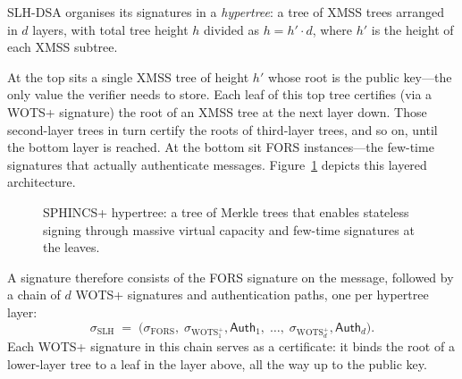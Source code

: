 SLH-DSA organises its signatures in a \emph{hypertree}: a tree of XMSS trees arranged in $d$ layers, with total tree height $h$ divided as $h = h' \cdot d$, where $h'$ is the height of each XMSS subtree.

At the top sits a single XMSS tree of height $h'$ whose root is the public key---the only value the verifier needs to store.  Each leaf of this top tree certifies (via a WOTS+ signature) the root of an XMSS tree at the next layer down.  Those second-layer trees in turn certify the roots of third-layer trees, and so on, until the bottom layer is reached.  At the bottom sit FORS instances---the few-time signatures that actually authenticate messages.  Figure~\ref{fig:ch10-sphincs-hypertree} depicts this layered architecture.

\begin{figure}[t]
\centering
{}
\caption{SPHINCS+ hypertree: a tree of Merkle trees that enables stateless signing through massive virtual capacity and few-time signatures at the leaves.}
\label{fig:ch10-sphincs-hypertree}
\end{figure}

A signature therefore consists of the FORS signature on the message, followed by a chain of $d$ WOTS+ signatures and authentication paths, one per hypertree layer:
\begin{equation}
\label{eq:slh-sig}
\sigma_{\mathrm{SLH}} \;=\; \bigl(\sigma_{\mathrm{FORS}},\; \sigma_{\mathrm{WOTS}^+_1}, \mathsf{Auth}_1,\; \ldots,\; \sigma_{\mathrm{WOTS}^+_d}, \mathsf{Auth}_d\bigr).
\end{equation}
Each WOTS+ signature in this chain serves as a certificate: it binds the root of a lower-layer tree to a leaf in the layer above, all the way up to the public key.

